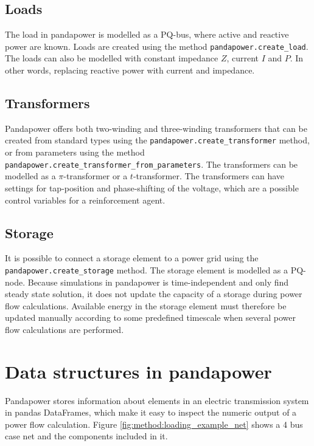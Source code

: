 \documentclass[class=book, crop=false]{standalone}
\begin{document}
\subsection{Loads}
The load in pandapower is modelled as a PQ-bus, where active and reactive power are known. Loads are created using the method \texttt{pandapower.create\_load}. The loads can also be modelled with constant impedance $Z$, current $I$ and $P$. In other words, replacing reactive power with current and impedance.

\subsection{Transformers}
Pandapower offers both two-winding and three-winding transformers that can be created from standard types using the \texttt{pandapower.create\_transformer} method, or from parameters using the method
\texttt{pandapower.create\_transformer\_from\_parameters}. The transformers can be modelled as a $\pi$-transformer or a $t$-transformer. The transformers can have settings for tap-position and phase-shifting of the voltage, which are a possible control variables for a reinforcement agent.  

\subsection{Storage}
It is possible to connect a storage element to a power grid using the \texttt{pandapower.create\_storage} method. The storage element is modelled as a PQ-node. Because simulations in pandapower is time-independent and only find steady state solution, it does not update the capacity of a storage during power flow calculations. Available energy in the storage element must therefore be updated manually according to some predefined timescale when several power flow calculations are performed.  


\section{Data structures in pandapower}

Pandapower stores information about elements in an electric transmission system in pandas DataFrames, which make it easy to inspect the numeric output of a power flow calculation. Figure \ref{fig:method:loading_example_net} shows a 4 bus case net and the components included in it. 
\end{document}
